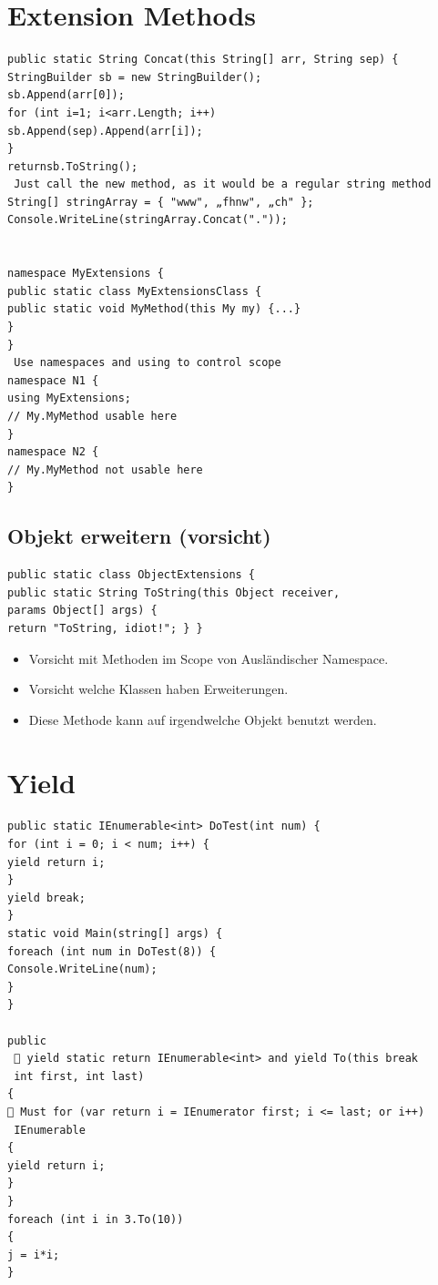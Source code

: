 \documentclass[a4paper,10pt]{scrartcl}
\begin{document}
\section{Extension Methods}
\begin{lstlisting}[caption=Extension Methods Beispiel]
 public static String Concat(this String[] arr, String sep) {
StringBuilder sb = new StringBuilder();
sb.Append(arr[0]);
for (int i=1; i<arr.Length; i++)
sb.Append(sep).Append(arr[i]);
}
returnsb.ToString();
 Just call the new method, as it would be a regular string method
String[] stringArray = { "www", „fhnw", „ch" };
Console.WriteLine(stringArray.Concat("."));


namespace MyExtensions {
public static class MyExtensionsClass {
public static void MyMethod(this My my) {...}
}
}
 Use namespaces and using to control scope
namespace N1 {
using MyExtensions;
// My.MyMethod usable here
}
namespace N2 {
// My.MyMethod not usable here
}
\end{lstlisting}

\subsection{Objekt erweitern (vorsicht)}
\begin{lstlisting}[caption=Objekt Extension Method]
 public static class ObjectExtensions {
public static String ToString(this Object receiver,
params Object[] args) {
return "ToString, idiot!"; } }

\end{lstlisting}
\begin{itemize}
 \item Vorsicht mit Methoden im Scope von Ausländischer Namespace.
 \item Vorsicht welche Klassen haben Erweiterungen.
 \item Diese Methode kann auf irgendwelche Objekt benutzt werden.
 
\end{itemize}

\section{Yield}
\begin{lstlisting}[caption=yield Beispiel]
 public static IEnumerable<int> DoTest(int num) {
for (int i = 0; i < num; i++) {
yield return i;
}
yield break;
}
static void Main(string[] args) {
foreach (int num in DoTest(8)) {
Console.WriteLine(num);
}
}

public
  yield static return IEnumerable<int> and yield To(this break
 int first, int last)
{
 Must for (var return i = IEnumerator first; i <= last; or i++)
 IEnumerable
{
yield return i;
}
}
foreach (int i in 3.To(10))
{
j = i*i;
}


\end{lstlisting}
\end{document}
